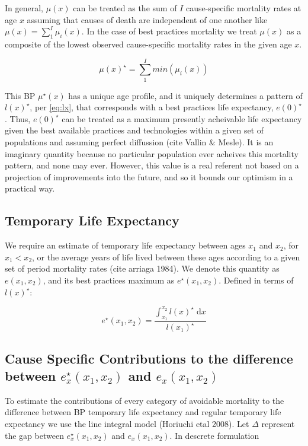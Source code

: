 \documentclass{article}
\newcommand{\dd}{\; \mathrm{d}}
\begin{document}
In general, $\mu(x)$ can be treated as the sum of $I$ cause-specific mortality
rates at age $x$ assuming that causes of death are independent of one another like $\mu(x) = \sum_1^I \mu_i(x)$. In the case of best practices mortality we treat $\mu(x)$ as a composite of the lowest observed cause-specific mortality rates in the given age $x$.

\begin{equation}
\label{eq:mxmin}
\mu(x)^{\star} = \sum_1^I min(\mu_i(x))
\end{equation}

This BP $\mu^{\star}(x)$ has a unique age profile, and it uniquely
determines a pattern of $l(x)^{\star}$, per \eqref{eq:lx}, that corresponds with a
best practices life expectancy, $e(0)^{\star}$. Thus, $e(0)^{\star}$ can be treated as a
maximum presently acheivable life expectancy given the best available
practices and technologies within a given set of populations and assuming
perfect diffussion (cite Vallin \& Mesle). It is an imaginary quantity because no particular population
ever acheives this mortality pattern, and none may ever. However, this value is
a real referent not based on a projection of improvements into the future, and
so it bounds our optimism in a practical way.

\subsection*{Temporary Life Expectancy}

We require an estimate of temporary life expectancy between ages
$x_1$ and $x_2$, for $x_1<x_2$, or the average years of life lived between these ages according to a given set of period mortality rates (cite arriaga 1984). We denote this quantity as
$e(x_1,x_2)$, and its best practices maximum as $e^{\star}(x_1,x_2)$. Defined in
terms of $l(x)^\star$:


\begin{equation}
e^{\star}(x_1,x_2) = \frac{\int _{x_1}^{x_2} l(x)^\star \dd x}{l(x_1)^\star}
\end{equation}

\subsection*{Cause Specific Contributions to the difference between
$e_x^{\star}(x_1,x_2)$ and $e_x(x_1,x_2)$}

To estimate the contributions of every category of avoidable mortality to the difference between BP temporary life expectancy and regular temporary life expectancy we use the line integral model (Horiuchi etal 2008). Let $\Delta$ represent the gap between $e_x^{\star}(x_1,x_2)$ and $e_x(x_1,x_2)$. In descrete formulation
\end{document}
